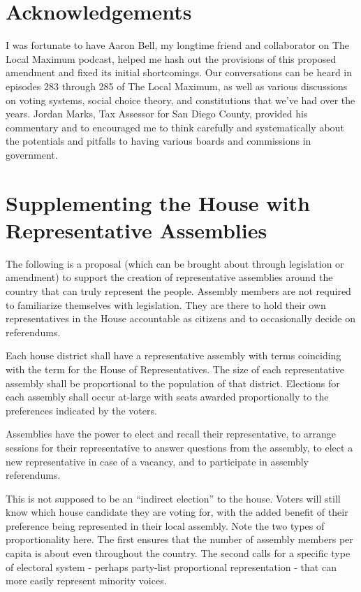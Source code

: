 \documentclass{article}
\newcommand{\quotes}[1]{``#1''}
\begin{document}
\section*{Acknowledgements}

I was fortunate to have Aaron Bell, my longtime friend and collaborator on The Local Maximum podcast, helped me hash out the provisions of this proposed amendment and fixed its initial shortcomings. Our conversations can be heard in episodes 283 through 285 of The Local Maximum, as well as various discussions on voting systems, social choice theory, and constitutions that we've had over the years. Jordan Marks, Tax Assessor for San Diego County, provided his commentary and to encouraged me to think carefully and systematically about the potentials and pitfalls to having various boards and commissions in government.

\appendix
\section{Supplementing the House with Representative Assemblies}
\label{appendix:house}

The following is a proposal (which can be brought about through legislation or amendment) to support the creation of representative assemblies around the country that can truly represent the people. Assembly members are not required to familiarize themselves with legislation. They are there to hold their own representatives in the House accountable as citizens and to occasionally decide on referendums.

\begin{quoting}
Each house district shall have a representative assembly with terms coinciding with the term for the House of Representatives. The size of each representative assembly shall be proportional to the population of that district. Elections for each assembly shall occur at-large with seats awarded proportionally to the preferences indicated by the voters.

Assemblies have the power to elect and recall their representative, to arrange sessions for their representative to answer questions from the assembly, to elect a new representative in case of a vacancy, and to participate in assembly referendums.
\end{quoting}

This is not supposed to be an \quotes{indirect election} to the house. Voters will still know which house candidate they are voting for, with the added benefit of their preference being represented in their local assembly. Note the two types of proportionality here. The first ensures that the number of assembly members per capita is about even throughout the country. The second calls for a specific type of electoral system - perhaps party-list proportional representation - that can more easily represent minority voices.
\end{document}
